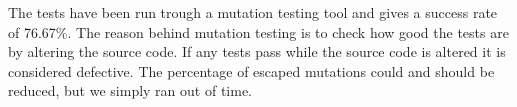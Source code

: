 The tests have been run trough a mutation testing tool and gives a success rate of 76.67\%. The reason behind mutation testing is to check how good the tests are by altering the source code. If any tests pass while the source code is altered it is considered defective. The percentage of escaped mutations could and should be reduced, but we simply ran out of time.


